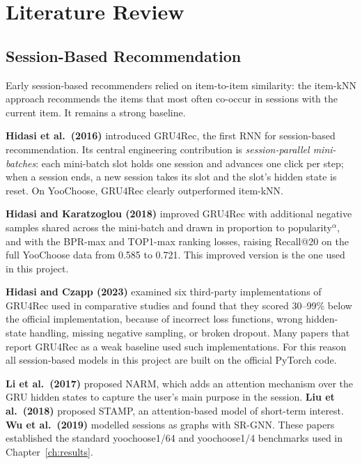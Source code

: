 \chapter{Literature Review}
\label{ch:literature}

\section{Session-Based Recommendation}

Early session-based recommenders relied on item-to-item similarity: the item-kNN
approach recommends the items that most often co-occur in sessions with the
current item. It remains a strong baseline.

\textbf{Hidasi et al.\ (2016)} \cite{hidasi2016} introduced GRU4Rec, the first
RNN for session-based recommendation. Its central engineering contribution is
\emph{session-parallel mini-batches}: each mini-batch slot holds one session and
advances one click per step; when a session ends, a new session takes its slot
and the slot's hidden state is reset. On YooChoose, GRU4Rec clearly outperformed
item-kNN.

\textbf{Hidasi and Karatzoglou (2018)} \cite{hidasi2018} improved GRU4Rec with
additional negative samples shared across the mini-batch and drawn in proportion
to popularity$^\alpha$, and with the BPR-max and TOP1-max ranking losses, raising
Recall@20 on the full YooChoose data from 0.585 to 0.721. This improved version
is the one used in this project.

\textbf{Hidasi and Czapp (2023)} \cite{hidasi2023} examined six third-party
implementations of GRU4Rec used in comparative studies and found that they
scored 30--99\% below the official implementation, because of incorrect loss
functions, wrong hidden-state handling, missing negative sampling, or broken
dropout. Many papers that report GRU4Rec as a weak baseline used such
implementations. For this reason all session-based models in this project are
built on the official PyTorch code.

\textbf{Li et al.\ (2017)} \cite{li2017} proposed NARM, which adds an attention
mechanism over the GRU hidden states to capture the user's main purpose in the
session. \textbf{Liu et al.\ (2018)} \cite{liu2018} proposed STAMP, an
attention-based model of short-term interest. \textbf{Wu et al.\ (2019)}
\cite{wu2019} modelled sessions as graphs with SR-GNN. These papers established
the standard yoochoose1/64 and yoochoose1/4 benchmarks used in
Chapter~\ref{ch:results}.

